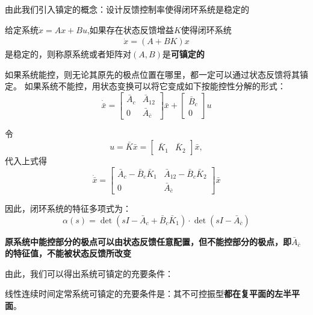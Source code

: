 由此我们引入镇定的概念：设计反馈控制率使得闭环系统是稳定的
\begin{definition}
    给定系统$\dot{x} = A x + B u$,如果存在状态反馈增益$K$使得闭环系统
    \begin{align*}
        \dot{x} = (A+BK)x
    \end{align*}
    是稳定的，则称原系统或者矩阵对$(A,B)$是\textbf{可镇定的}
\end{definition}

如果系统能控，则无论其原先的极点位置在哪里，都一定可以通过状态反馈将其镇定。
如果系统不能控，用状态变换可以将它变成如下按能控性分解的形式：
\[
\dot{\bar{x}}
=
\begin{bmatrix}
\bar{A}_c & \bar{A}_{12} \\
0 & \bar{A}_{\bar{c}}
\end{bmatrix}\bar{x}
+
\begin{bmatrix}
\bar{B}_c \\
0
\end{bmatrix}u
\]

令
\[
u=\bar{K}\bar{x}
=
\begin{bmatrix}
\bar{K}_1 & \bar{K}_2
\end{bmatrix}\bar{x},
\]
代入上式得
\[
\dot{\bar{x}}
=
\begin{bmatrix}
\bar{A}_c-\bar{B}_c\bar{K}_1
&
\bar{A}_{12}-\bar{B}_c\bar{K}_2 \\
0
&
\bar{A}_{\bar{c}}
\end{bmatrix}\bar{x}
\]

因此，闭环系统的特征多项式为：
\[
\alpha(s)
=
\det\left(sI-\bar{A}_c+\bar{B}_c\bar{K}_1\right)
\cdot
\det\left(sI-\bar{A}_{\bar{c}}\right)
\]

\textbf{原系统中能控部分的极点可以由状态反馈任意配置，但不能控部分的极点，即$\bar{A}_{\bar{c}}$的特征值，不能被状态反馈所改变}

由此，我们可以得出系统可镇定的充要条件：
\begin{theorem}
    线性连续时间定常系统可镇定的充要条件是：其不可控振型\textbf{都在复平面的左半平面}。   
\end{theorem}

